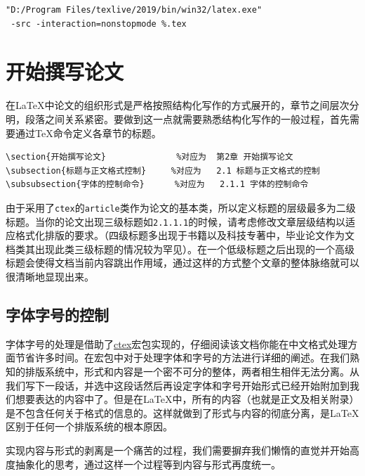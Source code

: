 \begin{verbatim}
"D:/Program Files/texlive/2019/bin/win32/latex.exe"
 -src -interaction=nonstopmode %.tex
\end{verbatim}

\section{开始撰写论文}
在\LaTeX 中论文的组织形式是严格按照结构化写作的方式展开的，章节之间层次分明，段落之间关系紧密。要做到这一点就需要熟悉结构化写作的一般过程，首先需要通过\TeX 命令定义各章节的标题。
\begin{verbatim}
\section{开始撰写论文}              %对应为  第2章 开始撰写论文
\subsection{标题与正文格式控制}     %对应为   2.1 标题与正文格式的控制 
\subsubsection{字体的控制命令}      %对应为   2.1.1 字体的控制命令
\end{verbatim}
由于采用了\verb|ctex|的\verb|article|类作为论文的基本类，所以定义标题的层级最多为二级标题。当你的论文出现三级标题如\verb|2.1.1.1|的时候，请考虑修改文章层级结构以适应格式化排版的要求。（四级标题多出现于书籍以及科技专著中，毕业论文作为文档类其出现此类三级标题的情况较为罕见）。在一个低级标题之后出现的一个高级标题会使得文档当前内容跳出作用域，通过这样的方式整个文章的整体脉络就可以很清晰地显现出来。
\subsection{字体字号的控制}
字体字号的处理是借助了\href{http://mirror.hust.edu.cn/CTAN/language/chinese/ctex/doc/ctex.pdf}{ctex}宏包实现的，仔细阅读该文档你能在中文格式处理方面节省许多时间。在宏包中对于处理字体和字号的方法进行详细的阐述。在我们熟知的排版系统中，形式和内容是一个密不可分的整体，两者相生相伴无法分离。从我们写下一段话，并选中这段话然后再设定字体和字号开始形式已经开始附加到我们想要表达的内容中了。但是在\LaTeX 中，所有的内容（也就是正文及相关附录）是不包含任何关于格式的信息的。这样就做到了形式与内容的彻底分离，是\LaTeX 区别于任何一个排版系统的根本原因。

实现内容与形式的剥离是一个痛苦的过程，我们需要摒弃我们懒惰的直觉并开始高度抽象化的思考，通过这样一个过程等到内容与形式再度统一。
